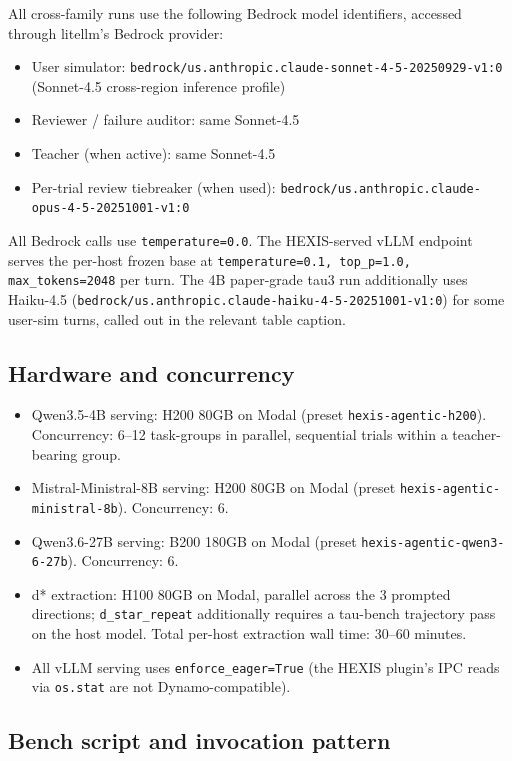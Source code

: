 All cross-family runs use the following Bedrock model identifiers, accessed through litellm's Bedrock provider:
\begin{itemize}[leftmargin=*]
\item User simulator: \texttt{bedrock/us.anthropic.claude-sonnet-4-5-20250929-v1:0} (Sonnet-4.5 cross-region inference profile)
\item Reviewer / failure auditor: same Sonnet-4.5
\item Teacher (when active): same Sonnet-4.5
\item Per-trial review tiebreaker (when used): \texttt{bedrock/us.anthropic.claude-opus-4-5-20251001-v1:0}
\end{itemize}
All Bedrock calls use \texttt{temperature=0.0}. The HEXIS-served vLLM endpoint serves the per-host frozen base at \texttt{temperature=0.1, top\_p=1.0, max\_tokens=2048} per turn. The 4B paper-grade tau3 run additionally uses Haiku-4.5 (\texttt{bedrock/us.anthropic.claude-haiku-4-5-20251001-v1:0}) for some user-sim turns, called out in the relevant table caption.

\subsection{Hardware and concurrency}

\begin{itemize}[leftmargin=*]
\item Qwen3.5-4B serving: H200 80GB on Modal (preset \texttt{hexis-agentic-h200}). Concurrency: 6--12 task-groups in parallel, sequential trials within a teacher-bearing group.
\item Mistral-Ministral-8B serving: H200 80GB on Modal (preset \texttt{hexis-agentic-ministral-8b}). Concurrency: 6.
\item Qwen3.6-27B serving: B200 180GB on Modal (preset \texttt{hexis-agentic-qwen3-6-27b}). Concurrency: 6.
\item d* extraction: H100 80GB on Modal, parallel across the 3 prompted directions; \texttt{d\_star\_repeat} additionally requires a tau-bench trajectory pass on the host model. Total per-host extraction wall time: 30--60 minutes.
\item All vLLM serving uses \texttt{enforce\_eager=True} (the HEXIS plugin's IPC reads via \texttt{os.stat} are not Dynamo-compatible).
\end{itemize}

\subsection{Bench script and invocation pattern}

